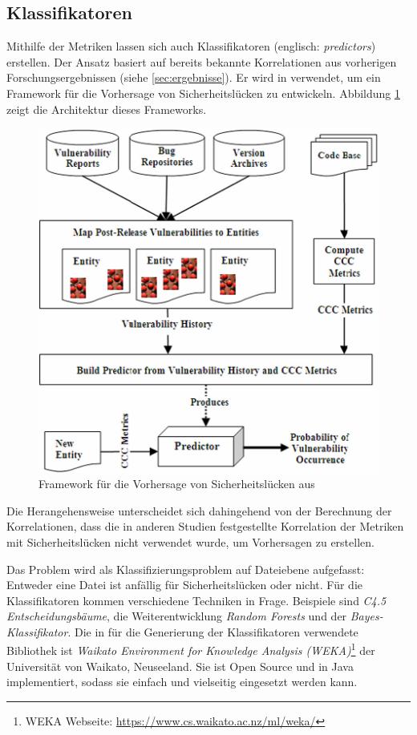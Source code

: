 \subsection{Klassifikatoren}
Mithilfe der Metriken lassen sich auch Klassifikatoren (englisch: \emph{predictors}) erstellen.
Der Ansatz basiert auf bereits bekannte Korrelationen aus vorherigen Forschungsergebnissen (siehe \ref{sec:ergebnisse}).
Er wird in \cite{chowdhury_zulkernine_2009} verwendet, um ein Framework für die Vorhersage von Sicherheitslücken zu entwickeln.
Abbildung \ref{fig:framework} zeigt die Architektur dieses Frameworks.
\begin{figure}
	\includegraphics[width=\textwidth]{img/framework.png}
	\caption{Framework für die Vorhersage von Sicherheitslücken aus \cite{chowdhury_zulkernine_2009}}
	\label{fig:framework}
\end{figure}
Die Herangehensweise unterscheidet sich dahingehend von der Berechnung der Korrelationen, dass die in anderen Studien festgestellte Korrelation der Metriken mit Sicherheitslücken nicht verwendet wurde, um Vorhersagen zu erstellen.

Das Problem wird als Klassifizierungsproblem auf Dateiebene aufgefasst:
Entweder eine Datei ist anfällig für Sicherheitslücken oder nicht.
Für die Klassifikatoren kommen verschiedene Techniken in Frage.
Beispiele sind \emph{C4.5 Entscheidungsbäume}\cite{decision_trees}, die Weiterentwicklung \emph{Random Forests} und der \emph{Bayes-Klassifikator}.
Die in \cite{chowdhury_zulkernine_2009} für die Generierung der Klassifikatoren verwendete Bibliothek ist \emph{Waikato Environment for Knowledge Analysis (WEKA)}\footnote{WEKA Webseite: \url{https://www.cs.waikato.ac.nz/ml/weka/}} der Universität von Waikato, Neuseeland.
Sie ist Open Source und in Java implementiert, sodass sie einfach und vielseitig eingesetzt werden kann.

